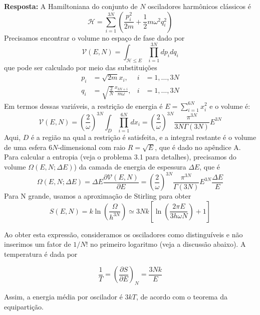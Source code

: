 \documentclass[12pt]{article}
\begin{document}
\textbf{Resposta:} A Hamiltoniana do conjunto de $N$ osciladores harmônicos clássicos é 
\[
\mathcal{H} = \sum_{i=1}^{3N} \left( \frac{p_i^2}{2m} + \frac{1}{2} m \omega^2 q_i^2 \right)
\]
Precisamos encontrar o volume no espaço de fase dado por 
\[
\mathcal{V}(E, N) = \int_{\mathcal{H} \leq E} \prod_{i=1}^{3N} dp_i dq_i
\]
que pode ser calculado por meio das substituições 
\[
\begin{aligned}
p_i &= \sqrt{2m} x_i, & i &= 1, \dots, 3N \\
q_i &= \sqrt{\frac{2}{N}} \frac{x_{3N + i}}{m \omega}, & i &= 1, \dots, 3N
\end{aligned}
\]
Em termos dessas variáveis, a restrição de energia é $E = \sum_{i=1}^{6N} x_i^2$ e o volume é: 
\[
\mathcal{V}(E, N) = \left( \frac{2}{\omega} \right)^{3N} \int_D \prod_{i=1}^{6N} dx_i 
= \left( \frac{2}{\omega} \right)^{3N} \frac{\pi^{3N}}{3N \Gamma(3N)} E^{3N} 
\]
Aqui, $D$ é a região na qual a restrição é satisfeita, e a integral restante é o volume de uma esfera $6N$-dimensional com raio $R = \sqrt{E}$, que é dado no apêndice A. Para calcular a entropia (veja o problema 3.1 para detalhes), precisamos do volume $\Omega(E, N; \Delta E)$) da camada de energia de espessura $\Delta E$, que é 
\[
\Omega(E, N; \Delta E) = \Delta E \frac{\partial \mathcal{V}(E, N)}{\partial E} 
= \left( \frac{2}{\omega} \right)^{3N} \frac{\pi^{3N}}{\Gamma(3N)} E^{3N} \frac{\Delta E}{E} 
\]
Para N grande, usamos a aproximação de Stirling para obter
\[
S(E, N) = k \ln \left( \frac{\Omega}{h^{3N}} \right) 
\simeq 3Nk \left[ \ln \left( \frac{2 \pi E}{3 h \omega N} \right) + 1 \right]
\]

Ao obter esta expressão, consideramos os osciladores como distinguíveis e não inserimos um fator de $1/N!$ no primeiro logaritmo (veja a discussão abaixo). A temperatura é dada por

\[
\frac{1}{T} = \left( \frac{\partial S}{\partial E} \right)_N = \frac{3Nk}{E}
\]

Assim, a energia média por oscilador é $3kT$, de acordo com o teorema da equipartição.
\end{document}
